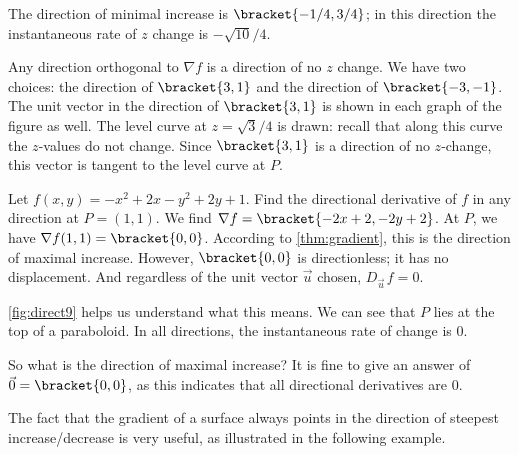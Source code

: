 \begin{example}

The direction of minimal increase is $\bracket{-1/4,3/4}$; in this direction the instantaneous rate of $z$ change is $-\sqrt{10}/4%
$.

Any direction orthogonal to $\nabla f$ is a direction of no $z$ change. We have two choices: the direction of $\bracket{3,1}$ and the direction of $\bracket{-3,-1}$. The unit vector in the direction of $\bracket{3,1}$ is shown in each graph of the figure as well. The level curve at $z=\sqrt{3}/4$ is drawn: recall that along this curve the $z$-values do not change. Since $\bracket{3,1}$ is a direction of no $z$-change, this vector is tangent to the level curve at $P$.
\end{example}

\begin{example}[Understanding when $\nabla f = \vec 0$]\label{ex_direct9}
Let $f(x,y) = -x^2+2x-y^2+2y+1$. Find the directional derivative of $f$ in any direction at $P=(1,1)$.
\solution
We find $\nabla f =\bracket{-2x+2, -2y+2}$. At $P$, we have $\nabla f(1,1) =\bracket{0,0}$. 
According to \autoref{thm:gradient}, this is the direction of maximal increase. However, $\bracket{0,0}$ is directionless; it has no displacement. And regardless of the unit vector $\vec u$ chosen, $D_{\vec u\,}f = 0$.


\autoref{fig:direct9} helps us understand what this means. We can see that $P$ lies at the top of a paraboloid. In all directions, the instantaneous rate of change is 0. 

So what is the direction of maximal increase? It is fine to give an answer of $\vec 0 =\bracket{0,0}$, as this indicates that all directional derivatives are 0.
\end{example}

The fact that the gradient of a surface always points in the direction of steepest increase/decrease is very useful, as illustrated in the following example.

